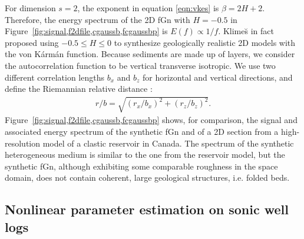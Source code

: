 For dimension $s=2$, the exponent in equation \ref{eqn:vkes} is $\beta=2H+2$.
Therefore, the energy spectrum of the 2D fGn with $H=-0.5$ in Figure~\ref{fig:signal,f2dfile,cgaussb,fcgaussbp}
is $E(f)\propto 1/f$.
Klime\u{s}  in fact proposed using $-0.5\leq H\leq 0$ to synthesize geologically realistic 2D models
with the von K\'arm\'an function.
Because sediments are made up of layers, we consider the autocorrelation function to be vertical transverse isotropic.
We use two different correlation lengths $b_x$ and $b_z$ for horizontal and vertical directions,
and define the Riemannian relative distance \cite[]{Goff_J88}:
\begin{eqnarray}
r/b=\sqrt{(r_x/b_x)^2+(r_z/b_z)^2}.
\end{eqnarray}
Figure~\ref{fig:signal,f2dfile,cgaussb,fcgaussbp}
shows, for comparison, the signal and associated energy spectrum of the synthetic fGn 
and of a 2D section from a high-resolution model of a clastic reservoir in Canada.
The spectrum of the synthetic heterogeneous medium is similar to the one from the reservoir model,
but the synthetic fGn, although exhibiting some comparable roughness in the space domain,
does not contain coherent, large geological structures, i.e. folded beds.


\subsection{Nonlinear parameter estimation on sonic well logs}


